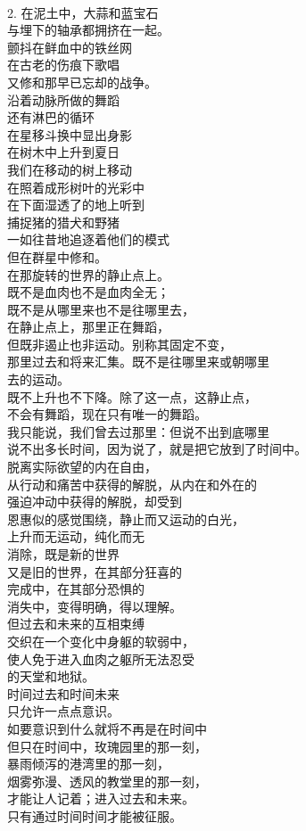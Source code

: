 \documentclass{article}
\begin{document}
 \\
2. 在泥土中，大蒜和蓝宝石\\
与埋下的轴承都拥挤在一起。\\
颤抖在鲜血中的铁丝网
\newpage
\\
在古老的伤痕下歌唱\\
又修和那早已忘却的战争。\\
沿着动脉所做的舞蹈\\
还有淋巴的循环\\
在星移斗换中显出身影\\
在树木中上升到夏日\\
我们在移动的树上移动\\
在照着成形树叶的光彩中\\
在下面湿透了的地上听到\\
捕捉猪的猎犬和野猪\\
一如往昔地追逐着他们的模式\\
但在群星中修和。\\
在那旋转的世界的静止点上。\\
既不是血肉也不是血肉全无；\\
既不是从哪里来也不是往哪里去，\\
在静止点上，那里正在舞蹈，\\
但既非遏止也非运动。别称其固定不变，\\
那里过去和将来汇集。既不是往哪里来或朝哪里\\
去的运动。\\
既不上升也不下降。除了这一点，这静止点，\\
不会有舞蹈，现在只有唯一的舞蹈。
\newpage
\\
我只能说，我们曾去过那里：但说不出到底哪里\\
说不出多长时间，因为说了，就是把它放到了时间中。\\
脱离实际欲望的内在自由，\\
从行动和痛苦中获得的解脱，从内在和外在的\\
强迫冲动中获得的解脱，却受到\\
恩惠似的感觉围绕，静止而又运动的白光，\\
上升而无运动，纯化而无\\
消除，既是新的世界\\
又是旧的世界，在其部分狂喜的\\
完成中，在其部分恐惧的\\
消失中，变得明确，得以理解。\\
但过去和未来的互相束缚\\
交织在一个变化中身躯的软弱中，\\
使人免于进入血肉之躯所无法忍受\\
的天堂和地狱。\\
时间过去和时间未来\\
只允许一点点意识。\\
如要意识到什么就将不再是在时间中\\
但只在时间中，玫瑰园里的那一刻，\\
暴雨倾泻的港湾里的那一刻，
\newpage
\\
烟雾弥漫、透风的教堂里的那一刻，\\
才能让人记着；进入过去和未来。\\
只有通过时间时间才能被征服。 
\end{document}
